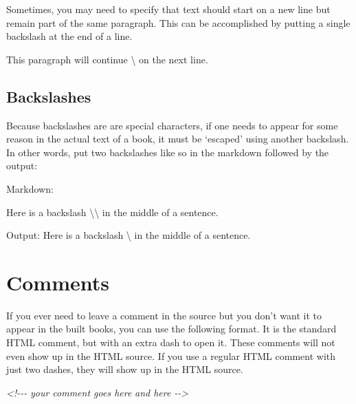 \documentclass[
]{book}
\newenvironment{Shaded}{\begin{snugshade}}{\end{snugshade}}
\newcommand{\CommentTok}[1]{\textcolor[rgb]{0.56,0.35,0.01}{\textit{#1}}}
\newcommand{\NormalTok}[1]{#1}
\newcommand{\SpecialCharTok}[1]{\textcolor[rgb]{0.00,0.00,0.00}{#1}}
\begin{document}
Sometimes, you may need to specify that text should start on a new line but remain part of the same paragraph. This can be accomplished by putting a single backslash at the end of a line.

\begin{Shaded}
\begin{Highlighting}[]
\NormalTok{This paragraph will continue \textbackslash{}}
\NormalTok{on the next line.}
\end{Highlighting}
\end{Shaded}

\hypertarget{backslashes}{%
\section{Backslashes}\label{backslashes}}

Because backslashes are are special characters, if one needs to appear for some reason in the actual text of a book, it must be `escaped' using another backslash. In other words, put two backslashes like so in the markdown followed by the output:

Markdown:

\begin{Shaded}
\begin{Highlighting}[]
\NormalTok{Here is a backslash }\SpecialCharTok{\textbackslash{}\textbackslash{}}\NormalTok{ in the middle of a sentence. }
\end{Highlighting}
\end{Shaded}

Output:
Here is a backslash \textbackslash{} in the middle of a sentence.

\hypertarget{comments}{%
\chapter{Comments}\label{comments}}

If you ever need to leave a comment in the source but you don't want it to appear in the built books, you can use the following format. It is the standard HTML comment, but with an extra dash to open it. These comments will not even show up in the HTML source. If you use a regular HTML comment with just two dashes, they will show up in the HTML source.

\begin{Shaded}
\begin{Highlighting}[]
\CommentTok{\textless{}!{-}{-}{-}}
\CommentTok{your comment goes here}
\CommentTok{and here}
\CommentTok{{-}{-}\textgreater{}}
\end{Highlighting}
\end{Shaded}
\end{document}
